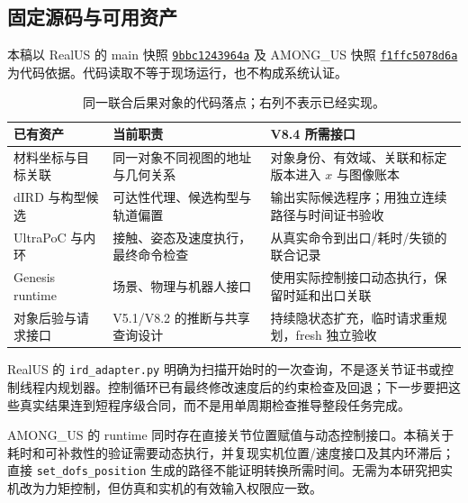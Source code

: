 \documentclass[11pt,a4paper,fontset=fandol]{ctexart}
\theoremstyle{definition}
\theoremstyle{remark}
\numberwithin{equation}{section}
\begin{document}
\subsection{固定源码与可用资产}
本稿以 RealUS 的 main 快照
\href{https://github.com/NingMeng0903/RealUS_playground/tree/9bbc1243964acff4fb47185fec1e148e748f42a2}{\texttt{9bbc1243964a}}
及 AMONG\_US 快照
\href{https://github.com/NingMeng0903/AMONG_US/tree/f1ffc5078d6a08c32b59107ab16086a7bbde488e}{\texttt{f1ffc5078d6a}}
为代码依据。代码读取不等于现场运行，也不构成系统认证。

\begin{table}[htbp]\centering\small
\begin{tabularx}{\linewidth}{P{.18\linewidth}YY}
\toprule
已有资产 & 当前职责 & V8.4 所需接口\\\midrule
材料坐标与目标关联 & 同一对象不同视图的地址与几何关系 & 对象身份、有效域、关联和标定版本进入 $x$ 与图像账本\\
dIRD 与构型候选 & 可达性代理、候选构型与轨道偏置 & 输出实际候选程序；用独立连续路径与时间证书验收\\
UltraPoC 与内环 & 接触、姿态及速度执行，最终命令检查 & 从真实命令到出口/耗时/失锁的联合记录\\
Genesis runtime & 场景、物理与机器人接口 & 使用实际控制接口动态执行，保留时延和出口关联\\
对象后验与请求接口 & V5.1/V8.2 的推断与共享查询设计 & 持续隐状态扩充，临时请求重规划，fresh 独立验收\\
\bottomrule
\end{tabularx}
\caption{同一联合后果对象的代码落点；右列不表示已经实现。}
\end{table}

RealUS 的 \texttt{ird\_adapter.py} 明确为扫描开始时的一次查询，不是逐关节证书或控制线程内规划器\cite{codeird}。控制循环已有最终修改速度后的约束检查及回退\cite{codeloop}；下一步要把这些真实结果连到短程序级合同，而不是用单周期检查推导整段任务完成。

AMONG\_US 的 runtime 同时存在直接关节位置赋值与动态控制接口\cite{coderuntime}。本稿关于耗时和可补救性的验证需要动态执行，并复现实机位置/速度接口及其内环滞后；直接 \texttt{set\_dofs\_position} 生成的路径不能证明转换所需时间。无需为本研究把实机改为力矩控制，但仿真和实机的有效输入权限应一致。
\end{document}
